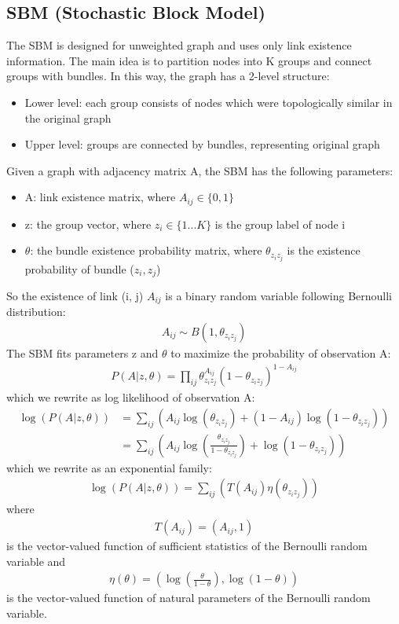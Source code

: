 \documentclass[letterpaper]{article}
\begin{document}
\subsection{SBM (Stochastic Block Model)}
The SBM is designed for unweighted graph and uses only link existence information.
The main idea is to partition nodes into K groups and connect groups with bundles.
In this way, the graph has a 2-level structure:
\begin{itemize}
	\item Lower level: each group consists of nodes which were topologically similar in the original graph
	\item Upper level: groups are connected by bundles, representing original graph
\end{itemize}
Given a graph with adjacency matrix A, the SBM has the following parameters:
\begin{itemize}
	\item A: link existence matrix, where $ A_{ij} \in \{0, 1\} $
	\item z: the group vector,
	where $ z_i \in \{ 1 ... K \} $ is the group label of node i
	\item $ \theta $: the bundle existence probability matrix,
	where $ \theta_{z_i z_j} $ is the existence probability of bundle ($z_i, z_j$)
\end{itemize}
So the existence of link (i, j) $ A_{ij} $ is a binary random variable following Bernoulli distribution:
\begin{align*}
	A_{ij} \sim B(1, \theta_{z_i z_j})
\end{align*}
The SBM fits parameters z and $ \theta $
to maximize the probability of observation A:
\begin{align*}
	P(A|z, \theta) 
	= \prod_{ij} \theta_{z_i z_j}^{A_{ij}}(1-\theta_{z_i z_j})^{1-A_{ij}}
\end{align*}
which we rewrite as log likelihood of observation A:
\begin{align*}
	\log(P(A|z, \theta))
	&= \sum_{ij} (
	{A_{ij}} \log (\theta_{z_i z_j})
	+ (1 - {A_{ij}}) \log(1-\theta_{z_i z_j})
	)\\
	&= \sum_{ij} (
	{A_{ij}} \log (\frac{\theta_{z_i z_j}}{1-\theta_{z_i z_j}})
	+ \log(1-\theta_{z_i z_j})
	)
\end{align*}
which we rewrite as an exponential family:
\begin{align*}
	\log(P(A|z, \theta))
	= \sum_{ij} (
	T(A_{ij}) \eta(\theta_{z_i z_j})
	)
\end{align*}
where
\begin{align*}
	T(A_{ij}) = (A_{ij}, 1)
\end{align*}
is the vector-valued function of sufficient statistics of the Bernoulli random variable and
\begin{align*}
\eta(\theta) = ( \log(\frac{\theta}{1-\theta}), \log(1-\theta) )
\end{align*}
is the vector-valued function of natural parameters of the Bernoulli random variable.
\end{document}
